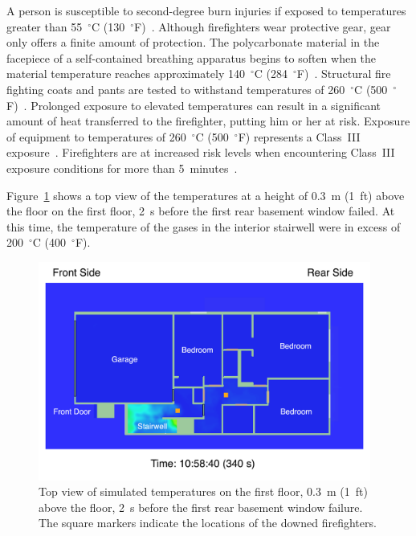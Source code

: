\documentclass[12pt,oneside]{book}
\begin{document}
A person is susceptible to second-degree burn injuries if exposed to temperatures greater than 55~$^{\circ}$C (130~$^{\circ}$F)~\cite{contactburn}. Although firefighters wear protective gear, gear only offers a finite amount of protection. The polycarbonate material in the facepiece of a self-contained breathing apparatus begins to soften when the material temperature reaches approximately 140~$^{\circ}$C (284~$^{\circ}$F)~\cite{mensch2011emergency}. Structural fire fighting coats and pants are tested to withstand temperatures of 260~$^{\circ}$C (500~$^{\circ}$F)~\cite{nfpa2013standard}. Prolonged exposure to elevated temperatures can result in a significant amount of heat transferred to the firefighter, putting him or her at risk. Exposure of equipment to temperatures of 260~$^{\circ}$C (500~$^{\circ}$F) represents a Class~III exposure~\cite{Donnelly2006}. Firefighters are at increased risk levels when encountering Class~III exposure conditions for more than 5~minutes~\cite{Donnelly2006}.

Figure~\ref{fig:smv_flow_path_top_1} shows a top view of the temperatures at a height of 0.3~m (1~ft) above the floor on the first floor, 2~s before the first rear basement window failed. At this time, the temperature of the gases in the interior stairwell were in excess of 200~$^{\circ}$C (400~$^{\circ}$F).

\begin{figure}[!ht]
\includegraphics[width=4.3in]{../Figures/SMV_Top_Temp_340_s}


\caption[Simulated temperatures on the first floor before basement window failure.]
{Top view of simulated temperatures on the first floor, 0.3~m (1~ft) above the floor, 2~s before the first rear basement window failure. The square markers indicate the locations of the downed firefighters.}
\label{fig:smv_flow_path_top_1}
\end{figure}
\end{document}
